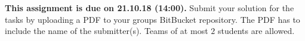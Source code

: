 \documentclass{exam}
\newcommand{\note}[1]{
	\noindent~\\
	\vspace{0.25cm}
	\fcolorbox{Red}{Orange}{\parbox{0.99\textwidth}{#1\\}}
	\vspace{0.25cm}
}
\newcommand{\duedate}{21.10.18 (14:00)}
\newcommand{\due}{{\bf This assignment is due on \duedate.} }
\begin{document}
\noindent
\due Submit your solution for the tasks by uploading a PDF to your groups BitBucket repository. The PDF has to include the name of the submitter(s). Teams of at most $2$ students are allowed.
\end{document}
